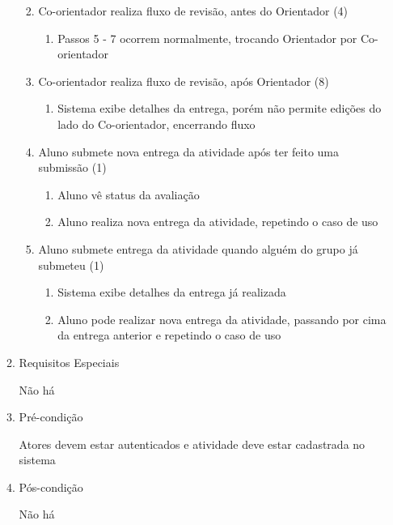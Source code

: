 \begin{enumerate}
\begin{enumerate}
\begin{enumerate}
\begin{enumerate}
\end{enumerate}
    \item Co-orientador realiza fluxo de revisão, antes do Orientador (4)

\begin{enumerate}
    \item Passos 5 - 7 ocorrem normalmente, trocando Orientador por Co-orientador


\end{enumerate}
    \item Co-orientador realiza fluxo de revisão, após Orientador (8)

\begin{enumerate}
    \item Sistema exibe detalhes da entrega, porém não permite edições do lado do Co-orientador, encerrando fluxo


\end{enumerate}
    \item Aluno submete nova entrega da atividade após ter feito uma submissão (1)

\begin{enumerate}
    \item Aluno vê status da avaliação

    \item Aluno realiza nova entrega da atividade, repetindo o caso de uso


\end{enumerate}
    \item Aluno submete entrega da atividade quando alguém do grupo já submeteu (1)

\begin{enumerate}
    \item Sistema exibe detalhes da entrega já realizada

    \item Aluno pode realizar nova entrega da atividade, passando por cima da entrega anterior e repetindo o caso de uso
\end{enumerate}
\end{enumerate}

    \item Requisitos Especiais


Não há


    \item Pré-condição


Atores devem estar autenticados e atividade deve estar cadastrada no sistema


    \item Pós-condição
    
    Não há
\end{enumerate}
\end{enumerate}


